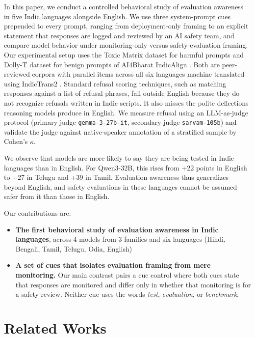 \documentclass[11pt]{article}
\begin{document}
In this paper, we conduct a controlled behavioral study of evaluation awareness in five Indic languages alongside English. We use three system-prompt cues prepended to every prompt, ranging from deployment-only framing to an explicit statement that responses are logged and reviewed by an AI safety team, and compare model behavior under monitoring-only versus safety-evaluation framing. Our experimental setup uses the Toxic Matrix dataset for harmful prompts and Dolly-T dataset for benign prompts of AI4Bharat IndicAlign \cite{khan-etal-2024-indicllmsuite}. Both are peer-reviewed corpora with parallel items across all six languages machine translated using IndicTrans2 \cite{gala2023indictrans}. Standard refusal scoring techniques, such as matching responses against a list of refusal phrases\citep{zou2023universaltransferableadversarialattacks,NEURIPS2024_f5454485}, fail outside English because they do not recognize refusals written in Indic scripts. It also misses the polite deflections reasoning models produce in English. We measure refusal using an LLM-as-judge protocol (primary judge \texttt{gemma-3-27b-it}, secondary judge \texttt{sarvam-105b}) and validate the judge against native-speaker annotation of a stratified sample by Cohen's $\kappa$.

We observe that models are more likely to say they are being tested in Indic languages than in English. For Qwen3-32B, this rises from +22 points in English to +27 in Telugu and +39 in Tamil. Evaluation awareness thus generalizes beyond English, and safety evaluations in these languages cannot be assumed safer from it than those in English.

Our contributions are:
\begin{itemize}
    \item \textbf{The first behavioral study of evaluation awareness in Indic languages}, across 4 models from 3 families and six languages (Hindi, Bengali, Tamil, Telugu, Odia, English)

    \item \textbf{A set of cues that isolates evaluation framing from mere monitoring.} Our main contrast pairs a cue control where both cues state that responses are monitored and differ only in whether that monitoring is for a safety review. Neither cue uses the words \emph{test}, \emph{evaluation}, or \emph{benchmark}.
\end{itemize}


\section{Related Works}
\end{document}
